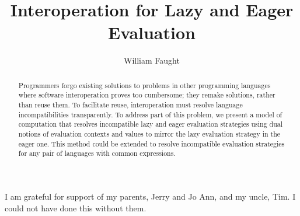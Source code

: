\documentclass[12pt]{ucthesis}
\begin{document}
\title{Interoperation for Lazy and Eager Evaluation}
\author{William Faught}
\maketitle
\begin{frontmatter}
\copyrightpage
\approvalpage

\begin{abstract}
Programmers forgo existing solutions to problems in other programming languages where software interoperation proves too cumbersome; they remake solutions, rather than reuse them. To facilitate reuse, interoperation must resolve language incompatibilities transparently. To address part of this problem, we present a model of computation that resolves incompatible lazy and eager evaluation strategies using dual notions of evaluation contexts and values to mirror the lazy evaluation strategy in the eager one. This method could be extended to resolve incompatible evaluation strategies for any pair of languages with common expressions.
\end{abstract}

\begin{acknowledgements}
\indent\indent I am grateful for support of my parents, Jerry and Jo Ann, and my uncle, Tim. I could not have done this without them.
\end{acknowledgements}

\tableofcontents
\listoffigures
\end{frontmatter}
\pagestyle{plain}
\renewcommand{\baselinestretch}{1.66}
\setlength{\belowcaptionskip}{12pt}






\clearpage



\end{document}
